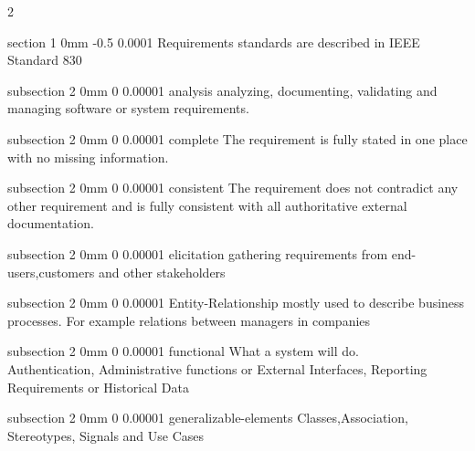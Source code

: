 \documentclass[a4paper,11pt]{article}
\makeatletter
\renewcommand{\section}{\@startsection
   {section}%
   {1}%
   {0mm}%
   {-0.5\baselineskip}%
   {0.0001\baselineskip}%
   {\sffamily\bfseries\upshape\normalsize}}%
\renewcommand{\subsection}{\@startsection
   {subsection}%
   {2}%
   {0mm}%
   {0\baselineskip}%
   {0.00001\baselineskip}%
   {\rmfamily\normalfont\slshape\normalsize}}%
\makeatother
\begin{document}
\begin{multicols}{2}

\section{Requirements}
standards are described in IEEE Standard 830

\subsection{analysis}
analyzing, documenting, validating and managing software or system requirements.

\subsection{complete}
The requirement is fully stated in one place with no missing information.

\subsection{consistent}
The requirement does not contradict any other requirement and is fully consistent with all authoritative external documentation.

\subsection{elicitation}
gathering requirements from end-users,customers and other stakeholders

\subsection{Entity-Relationship}
mostly used to describe business processes. For example relations between managers in companies

\subsection{functional}
What a system will do.
\\Authentication, Administrative functions or External Interfaces, Reporting Requirements or Historical Data

\subsection{generalizable-elements}
Classes,Association, Stereotypes, Signals and Use Cases


\end{multicols}
\end{document}
